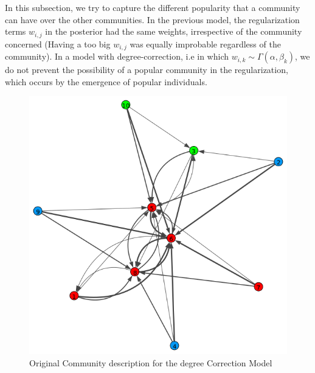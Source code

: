 \documentclass[12pt]{ociamthesis}  %
\begin{document}
	In this subsection, we try to capture the different popularity that a community can have over the other communities. In the previous model, the regularization terms $w_{i,j}$ in the posterior had the same weights, irrespective of the community concerned (Having a too big $w_{i,j}$ was equally improbable regardless of the community). In a model with degree-correction, i.e in which $w_{i,k} \sim  \Gamma(\alpha, \beta_{k})$, we do not prevent the possibility of a popular community in the regularization, which occurs by the emergence of popular individuals.
	\begin{figure}
		\centering
		\includegraphics[width=\textwidth,height=\textheight,keepaspectratio]{OriginalPlotDegreeCorrection}
		\caption{Original Community description for the degree Correction Model}
		\label{label-image5}
	\end{figure}
	
\end{document}
